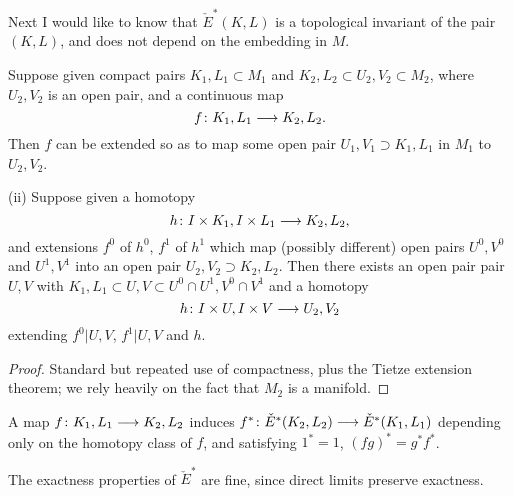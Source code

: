 \documentclass[../main]{subfiles}
\begin{document}
Next I would like to know that $\check{E}^*(K,L)$ is a topological invariant of the pair $(K,L)$, and does not depend on the embedding in $M$.
\begin{lemma}[i]\label{lem:p3c10.2}

Suppose given compact pairs $K_1,L_1 \subset M_1$ and $K_2,L_2 \subset U_2,V_2 \subset M_2$, where $U_2,V_2$ is an open pair, and a continuous map
\[f \colon K_1,L_1 \longrightarrow K_2,L_2.\]
Then $f$ can be extended so as to map some open pair $U_1,V_1 \supset K_1,L_1$ in $M_1$ to $U_2,V_2$.

(ii) Suppose given a homotopy 
\[h \colon I \times K_1,I \times L_1 \longrightarrow K_2,L_2,\]
and extensions $f^0$ of $h^0$, $f^1$ of $h^1$ which map (possibly different) open pairs $U^0,V^0$ and $U^1,V^1$ into an open pair $U_2,V_2 \supset K_2,L_2$. Then there exists an open pair pair $U,V$ with $K_1,L_1 \subset U,V \subset U^0 \cap U^1,V^0 \cap V^1$ and a homotopy 
\[h \colon I \times U, I \times V \longrightarrow U_2,V_2\]
extending $f^0|{U,V}$, $f^1|{U,V}$ and $h$.
\end{lemma}
\begin{proof}
Standard but repeated use of compactness, plus the Tietze extension theorem; we rely heavily on the fact that $M_2$ is a manifold.
\end{proof}
\begin{corollary}\label{cor:p3c10.3}
A map $f \colon K_1 , L_1 \longrightarrow K_2,L_2$ induces $f^* \colon \check{E}^*(K_2,L_2) \longrightarrow \check{E}^*(K_1,L_1)$ depending only on the homotopy class of $f$, and satisfying $1^* = 1$, $(fg)^* = g^* f^*$.
\end{corollary}

The exactness properties of $\check{E}^*$ are fine, since direct limits preserve exactness.
\end{document}
